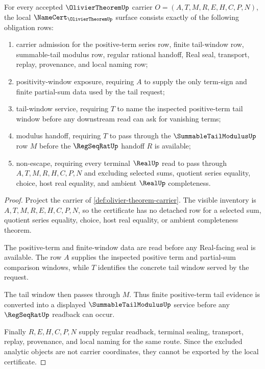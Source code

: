 \begin{theorem}
\label{thm:olivier-theorem-namecert-obligations}
For every accepted $\OlivierTheoremUp$ carrier $O=(A,T,M,R,E,H,C,P,N)$, the local $\NameCert_{\OlivierTheoremUp}$ surface consists exactly of the following obligation rows:
\begin{enumerate}
\item carrier admission for the positive-term series row, finite tail-window row, summable-tail modulus row, regular rational handoff, Real seal, transport, replay, provenance, and local naming row;
\item positivity-window exposure, requiring $A$ to supply the only term-sign and finite partial-sum data used by the tail request;
\item tail-window service, requiring $T$ to name the inspected positive-term tail window before any downstream read can ask for vanishing terms;
\item modulus handoff, requiring $T$ to pass through the $\SummableTailModulusUp$ row $M$ before the $\RegSeqRatUp$ handoff $R$ is available;
\item non-escape, requiring every terminal $\RealUp$ read to pass through $A,T,M,R,H,C,P,N$ and excluding selected sums, quotient series equality, choice, host real equality, and ambient $\RealUp$ completeness.
\end{enumerate}
\end{theorem}
\begin{proof}
Project the carrier of \autoref{def:olivier-theorem-carrier}. The visible inventory is $A,T,M,R,E,H,C,P,N$, so the certificate has no detached row for a selected sum, quotient series equality, choice, host real equality, or ambient completeness theorem.

The positive-term and finite-window data are read before any Real-facing seal is available. The row $A$ supplies the inspected positive term and partial-sum comparison windows, while $T$ identifies the concrete tail window served by the request.

The tail window then passes through $M$. Thus finite positive-term tail evidence is converted into a displayed $\SummableTailModulusUp$ service before any $\RegSeqRatUp$ readback can occur.

Finally $R,E,H,C,P,N$ supply regular readback, terminal sealing, transport, replay, provenance, and local naming for the same route. Since the excluded analytic objects are not carrier coordinates, they cannot be exported by the local certificate.
\end{proof}

